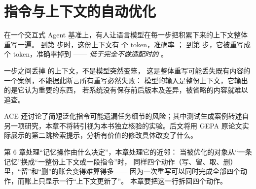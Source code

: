 \chapter{指令与上下文的自动优化}
\label{ch07}


\begin{failurebox}
在一个交互式 Agent 基准上，有人让语言模型在每一步把积累下来的上下文整体重写一遍。
到第  步时，这份上下文有  个 token，准确率 ；
到第  步，它被重写成  个 token，准确率掉到 ——
\emph{低于完全不做适配时的} \cite{ace-2510}。

一步之间丢掉  的上下文，不是模型突然变笨，
这是整体重写可能丢失既有内容的一个案例，不能据此断言所有重写必然失败：
模型的输入是整份上下文，它输出的是它认为重要的东西，
若系统没有保存前后版本及差异，被省略的内容就难以追查。

ACE 还讨论了简短泛化指令可能遗漏任务细节的风险；其中测试生成案例转述自另一项研究，本章不将转引视为本书独立核验的实验。后文将用 GEPA 原论文实际展示的第二跳检索提示，分析有价值的修改具体改变了什么。
\end{failurebox}


第 6 章处理``记忆操作由什么决定''，本章处理它的近邻：
当被优化的对象从``一条记忆''换成``一整份上下文或一段指令''时，
同样四个动作（写、留、取、删）里，``留''和``删''的账会变得难算得多——
因为一次重写可以同时完成全部四个动作，而账上只显示一行``上下文更新了''。
本章要把这一行拆回四个动作。


